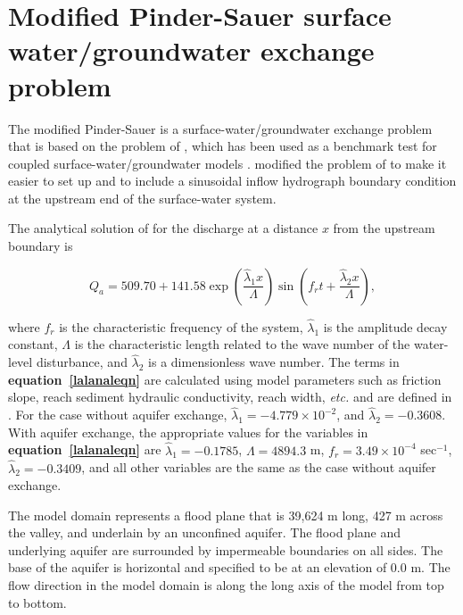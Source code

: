 \section{Modified Pinder-Sauer surface water/groundwater exchange problem}

The modified Pinder-Sauer is a surface-water/groundwater exchange problem that is based on the problem of \cite{pinder1971numerical}, which has been used as a benchmark test for coupled surface-water/groundwater models \citep[\textit{e.g.,}][]{hughes2015modflow,swain1996coupled}. \cite{lal2001modification} modified the problem of \cite{pinder1971numerical} to make it easier to set up and to include a sinusoidal inflow hydrograph boundary condition at the upstream end of the surface-water system.

The analytical solution of \cite{lal2001modification} for the discharge at a distance $x$ from the upstream boundary is

\begin{equation} \label{lalanaleqn}
Q_a = 509.70 + 141.58 \exp \left( \frac{\hat{\lambda}_{1} x}{\Lambda} \right) \sin \left( f_{r} t + \frac{\hat{\lambda}_{2} x}{\Lambda} \right),
\end{equation}

\noindent where $f_r$ is the characteristic frequency of the system, $\hat{\lambda}_{1}$ is the amplitude decay constant, $\Lambda$ is the characteristic length related to the wave number of the water-level disturbance, and $\hat{\lambda}_{2}$ is a dimensionless wave number. The terms in \textbf{equation~\ref{lalanaleqn}} are calculated using model parameters such as  friction slope, reach sediment hydraulic conductivity, reach width, \textit{etc.} and are defined in \cite{lal2001modification}. For the case without aquifer exchange, $\hat{\lambda}_{1} = -4.779 \times 10^{-2}$, and $\hat{\lambda}_{2} = -0.3608$. With aquifer exchange, the appropriate values for the variables in \textbf{equation~\ref{lalanaleqn}} are $\hat{\lambda}_{1} = -0.1785$, $\Lambda = 4894.3$ m, $f_{r} = 3.49 \times 10^{-4}$ sec$^{-1}$, $\hat{\lambda}_{2} = -0.3409$, and all other variables are the same as the case without aquifer exchange. 

The model domain represents a flood plane that is 39,624 m long, 427 m across the valley, and underlain by an unconfined aquifer. The flood plane and underlying aquifer are surrounded by impermeable boundaries on all sides. The base of the aquifer is horizontal and specified to be at an elevation of 0.0 m. The flow direction in the model domain is along the long axis of the model from top to bottom.

